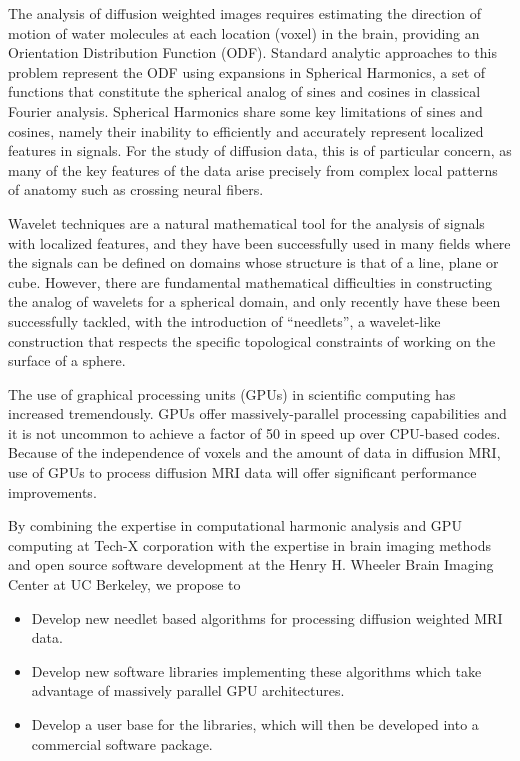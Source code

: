 \documentclass[10pt]{article}
\begin{document}
The analysis of diffusion weighted images requires estimating the direction of
motion of water molecules at each location (voxel) in the brain, providing an
Orientation Distribution Function (ODF). Standard analytic approaches to this
problem represent the ODF using expansions in Spherical Harmonics, a set of
functions that constitute the spherical analog of sines and cosines in
classical Fourier analysis.  Spherical Harmonics share some key limitations of
sines and cosines, namely their inability to efficiently and accurately
represent localized features in signals.  For the study of diffusion data, this
is of particular concern, as many of the key features of the data arise
precisely from complex local patterns of anatomy such as crossing neural
fibers.

Wavelet techniques are a natural mathematical tool for the analysis of signals
with localized features, and they have been successfully used in many fields
where the signals can be defined on domains whose structure is that of a line,
plane or cube.  However, there are fundamental mathematical difficulties in
constructing the analog of wavelets for a spherical domain, and only recently have
these been successfully tackled, with the introduction of
``needlets'', a wavelet-like construction that respects the specific
topological constraints of working on the surface of a sphere.

The use of graphical processing units (GPUs) in scientific computing has
increased tremendously. GPUs offer massively-parallel processing capabilities
and it is not uncommon to achieve a factor of 50 in speed up over CPU-based
codes. Because of the independence of voxels and the amount of data in
diffusion MRI, use of GPUs to process diffusion MRI data will offer significant
performance improvements.

By combining the expertise in computational harmonic analysis and GPU computing
at Tech-X corporation with the expertise in brain imaging methods and open
source software development at the Henry H. Wheeler Brain Imaging Center at UC
Berkeley, we propose to

\begin{itemize}
\item{Develop new needlet based algorithms for processing diffusion weighted
    MRI data.}
\item{Develop new software libraries implementing these algorithms which take
    advantage of massively parallel GPU architectures.}
\item{Develop a user base for the libraries, which will then be developed into
    a commercial software package.}
\end{itemize}
\end{document}
